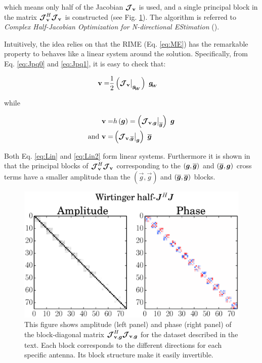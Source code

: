 \noindent which means only half of the
Jacobian $\bm{\mathcal{J}}_{\textbf{v}}$ is used, and a single principal block in the matrix
$\bm{\mathcal{J}}_{\textbf{v}}^H\bm{\mathcal{J}}_{\textbf{v}}$ is constructed (see Fig. \ref{fig:HalfJHJ}). The algorithm is referred to {\it Complex Half-Jacobian Optimization for
N-directional EStimation} (\COH).

Intuitively, the idea relies on that the RIME (Eq. \ref{eq:ME}) has the remarkable property to
behaves like a linear system around the solution. Specifically, from Eq. \ref{eq:Jpq0} and
\ref{eq:Jpq1}, it is easy to check that:

\begin{alignat}{2}
\label{eq:Lin}
\textbf{v}=&\frac{1}{2}\left(\bm{\mathcal{J}}_{\textbf{v}}\big|_{\bm{g_{\!_{W}}}}\right)\ \bm{g_{\!_{W}}}
\end{alignat}

\noindent while

\begin{alignat}{2}
\label{eq:Lin2}
\vis=&h\left(\vec{g}\right)=\left(\JVg\big|_{\conj{\g}}\right)\ \g\\
\text{and }\vis=&\left(\JVCg\big|_{\g}\right)\ \conj{\g}
\end{alignat}



Both Eq. \ref{eq:Lin} and \ref{eq:Lin2} form linear
systems. Furthermore it is shown in \citet[][]{SmirnovTasse14}
that the principal blocks of $\bm{\mathcal{J}}_{\textbf{v}}^H\bm{\mathcal{J}}_{\textbf{v}}$ corresponding to the
$(\vec{g},\conj{\vec{g}})$ and $(\conj{\vec{g}},\vec{g})$ cross
terms have a smaller amplitude than the $(\vec{g},\vec{g})$ and
$(\conj{\vec{g}},\conj{\vec{g}})$ blocks.


\begin{figure}[h!]
\begin{center}
\includegraphics[width=\columnwidth]{HalfJHJ2.eps}
\caption{\label{fig:HalfJHJ} This figure shows amplitude (left panel)
  and phase (right panel) of the block-diagonal matrix $\bm{\mathcal{J}}_{\textbf{v},\bm{g}}^H\bm{\mathcal{J}}_{\textbf{v},\bm{g}}$
  for the dataset described in the text. Each block corresponds to the
different directions for each specific antenna. Its block structure
make it easily invertible.}
\end{center}
\end{figure}

